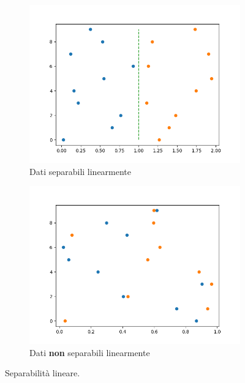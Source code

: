 \documentclass[12pt, twoside, letterpaper]{report}
\begin{document}
			\begin{figure}
				\begin{subfigure}[]{.5\textwidth}
					\centering
					\includegraphics[width=.9\linewidth]{linearly_separable.png}
					\caption{Dati separabili linearmente}
					\label{fig:linearly_separable}
				\end{subfigure}
				\hfill
				\begin{subfigure}[]{.5\textwidth}
					\centering
					\includegraphics[width=.9\linewidth]{not_linearly_separable.png}
					\caption{Dati \textbf{non} separabili linearmente}
					\label{fig:not_linearly_separable}
				\end{subfigure}
				
				\caption{Separabilità lineare.} \label{fig:sep_lin}
			\end{figure}	

				
				 
\end{document}
